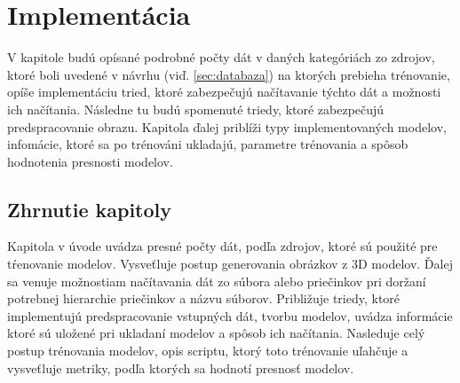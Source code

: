 
\chapter{Implementácia}

V kapitole budú opísané podrobné počty dát v daných kategóriách zo zdrojov, ktoré boli uvedené v návrhu (viď. \ref{sec:databaza})
    na ktorých prebieha trénovanie, opíše implementáciu tried, ktoré zabezpečujú načítavanie týchto dát a možnosti ich načítania.
Následne tu budú spomenuté triedy, ktoré zabezpečujú predspracovanie obrazu.
Kapitola ďalej priblíži typy implementovaných modelov, infomácie, ktoré sa po trénováni ukladajú, parametre trénovania a spôsob hodnotenia presnosti modelov.









\section{Zhrnutie kapitoly}

Kapitola v úvode uvádza presné počty dát, podľa zdrojov, ktoré sú použité pre tŕenovanie modelov.
Vysveťluje postup generovania obrázkov z 3D modelov.
Ďalej sa venuje možnostiam načítavania dát zo súbora alebo priečinkov pri doržaní potrebnej hierarchie priečinkov a názvu súborov.
Približuje triedy, ktoré implementujú predspracovanie vstupných dát, tvorbu modelov, uvádza informácie ktoré sú uložené
    pri ukladaní modelov a spôsob ich načítania.
Nasleduje celý postup trénovania modelov, opis scriptu, ktorý toto trénovanie uľahčuje a vysveťluje metriky, podľa ktorých sa hodnotí presnosť modelov.
